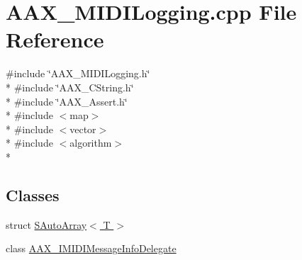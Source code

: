 \hypertarget{a00268}{}\section{A\+A\+X\+\_\+\+M\+I\+D\+I\+Logging.\+cpp File Reference}
\label{a00268}
{\ttfamily \#include \char`\"{}A\+A\+X\+\_\+\+M\+I\+D\+I\+Logging.\+h\char`\"{}}\\*
{\ttfamily \#include \char`\"{}A\+A\+X\+\_\+\+C\+String.\+h\char`\"{}}\\*
{\ttfamily \#include \char`\"{}A\+A\+X\+\_\+\+Assert.\+h\char`\"{}}\\*
{\ttfamily \#include $<$map$>$}\\*
{\ttfamily \#include $<$vector$>$}\\*
{\ttfamily \#include $<$algorithm$>$}\\*
\subsection*{Classes}
\begin{DoxyCompactItemize}
\item 
struct \hyperlink{a00148}{S\+Auto\+Array$<$ T $>$}
\item 
class \hyperlink{a00104}{A\+A\+X\+\_\+\+I\+M\+I\+D\+I\+Message\+Info\+Delegate}
\end{DoxyCompactItemize}
